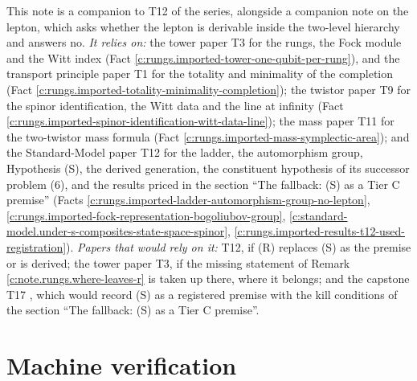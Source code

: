 \documentclass[11pt]{article}
\theoremstyle{definition}
\theoremstyle{plain}
\begin{document}
\label{c:note.rungs.setting-position-series}
This note is a companion to T12 of the series, alongside a companion note on the lepton, which asks whether the lepton is derivable inside the two-level hierarchy and answers no. \emph{It relies on:} the tower paper T3 \cite{ButlerT3} for the rungs, the Fock module and the Witt index (Fact \ref{c:rungs.imported-tower-one-qubit-per-rung}), and the transport principle paper T1 \cite{ButlerT1} for the totality and minimality of the completion (Fact \ref{c:rungs.imported-totality-minimality-completion}); the twistor paper T9 \cite{ButlerT9} for the spinor identification, the Witt data and the line at infinity (Fact \ref{c:rungs.imported-spinor-identification-witt-data-line}); the mass paper T11 \cite{ButlerT11} for the two-twistor mass formula (Fact \ref{c:rungs.imported-mass-symplectic-area}); and the Standard-Model paper T12 \cite{ButlerT12} for the ladder, the automorphism group, Hypothesis (S), the derived generation, the constituent hypothesis of its successor problem (6), and the results priced in the section ``The fallback: (S) as a Tier C premise'' (Facts \ref{c:rungs.imported-ladder-automorphism-group-no-lepton}, \ref{c:rungs.imported-fock-representation-bogoliubov-group}, \ref{c:standard-model.under-s-composites-state-space-spinor}, \ref{c:rungs.imported-results-t12-used-registration}). \emph{Papers that would rely on it:} T12, if (R) replaces (S) as the premise or is derived; the tower paper T3, if the missing statement of Remark \ref{c:note.rungs.where-leaves-r} is taken up there, where it belongs; and the capstone T17 \cite{ButlerT17}, which would record (S) as a registered premise with the kill conditions of the section ``The fallback: (S) as a Tier C premise''.

\section{Machine verification}
\end{document}
